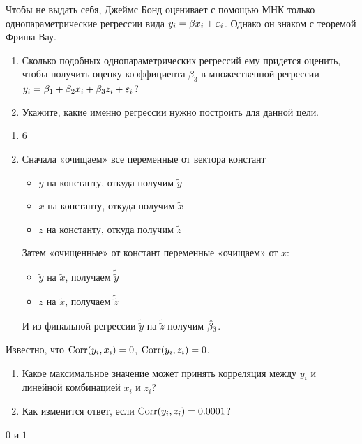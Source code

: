 \begin{problem} %
Чтобы не выдать себя, Джеймс Бонд оценивает с помощью МНК только однопараметрические регрессии вида $y_i=\beta x_i + \varepsilon_i$. Однако он знаком с теоремой Фриша-Вау.
\begin{enumerate}
\item Сколько подобных однопараметрических регрессий ему придется оценить, чтобы получить оценку коэффициента $\beta_3$ в множественной регрессии $y_i = \beta_1 + \beta_2 x_i + \beta_3 z_i + \varepsilon_i$?
\item Укажите, какие именно регрессии нужно построить для данной цели.
\end{enumerate}

\begin{sol}
\begin{enumerate}
\item 6
\item Сначала «очищаем» все переменные от вектора констант
\begin{itemize}
  \item $y$ на константу, откуда получим $\tilde{y}$
  \item $x$ на константу, откуда получим $\tilde{x}$
  \item $z$ на константу, откуда получим $\tilde{z}$
\end{itemize}
Затем «очищенные» от констант переменные «очищаем» от $x$:
\begin{itemize}
  \item $\tilde{y}$ на $\tilde{x}$, получаем $\tilde\tilde{y}$
  \item $\tilde{z}$ на $\tilde{x}$, получаем $\tilde\tilde{z}$
\end{itemize}
И из финальной регрессии $\tilde{\tilde{y}}$ на $\tilde{\tilde{z}}$ получим $\hat{\beta}_3$.
\end{enumerate}
\end{sol}
\end{problem}

\begin{problem}
Известно, что $\operatorname{Corr}(y_i, x_i)=0$, $\operatorname{Corr}(y_i, z_i)=0$.
\begin{enumerate}
\item Какое максимальное значение может принять корреляция между $y_i$ и линейной комбинацией $x_i$ и $z_i$?
\item Как изменится ответ, если $\operatorname{Corr}(y_i, z_i)=0.0001$?
\end{enumerate}


\begin{sol}
$0$ и $1$
\end{sol}
\end{problem}


